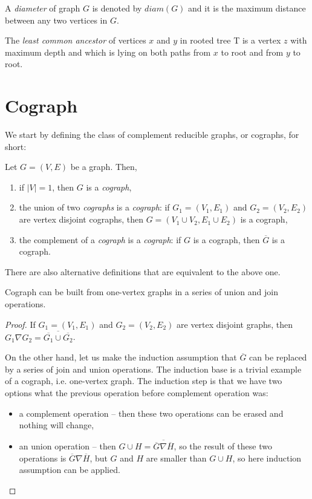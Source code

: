 \begin{definition}[diameter]
    A \emph{diameter} of graph $G$ is denoted by $diam(G)$ and it is the maximum distance between any two vertices in $G$. 
\end{definition}

\begin{definition}
    The \emph{least common ancestor} of vertices $x$ and $y$ in rooted tree T is a vertex $z$ with maximum depth and which is lying on both paths from $x$ to root and from $y$ to root.
\end{definition}

\section{Cograph}
We start by defining the class of complement reducible graphs, or cographs, for short:
\begin{definition}
Let $G = (V, E)$ be a graph. Then,
\begin{enumerate}
\item if $|V| = 1$, then $G$ is a \emph{cograph},
\item the union of two \emph{cographs} is a \emph{cograph}: if $G_1 = (V_1, E_1)$ and $G_2 = (V_2, E_2)$ are vertex disjoint cographs, then $G = (V_1 \cup V_2, E_1 \cup E_2)$ is a cograph,
\item the complement of a \emph{cograph} is a \emph{cograph}: if $G$ is a cograph, then $\overline{G}$ is a cograph.
\end{enumerate}
\end{definition}

There are also alternative definitions that are equivalent to the above one. 
\begin{theorem}
    Cograph can be built from one-vertex graphs in a series of union and join operations.
\end{theorem}
\begin{proof}
    If $G_1 = (V_1, E_1)$ and $G_2 = (V_2, E_2)$ are vertex disjoint graphs, then $G_1 \nabla G_2 = \overline{\overline{G_1} \cup \overline{G_2}}$. 

On the other hand, let us make the induction assumption that $\overline{G}$ can be replaced by a series of join and union operations. The induction base is a trivial example of a cograph, i.e. one-vertex graph.
 The induction step is that we have two options what the previous operation before complement operation was:
 \begin{itemize}
     \item a complement operation -- then these two operations can be erased and nothing will change,
     \item an union operation -- then $G \cup H = \overline{\overline{G} \nabla \overline{H}}$, so the result of these two operations is $\overline{G} \nabla \overline{H}$, but $G$ and $H$ are smaller than $G \cup H$, so here induction assumption can be applied.
 \end{itemize}
\end{proof}

